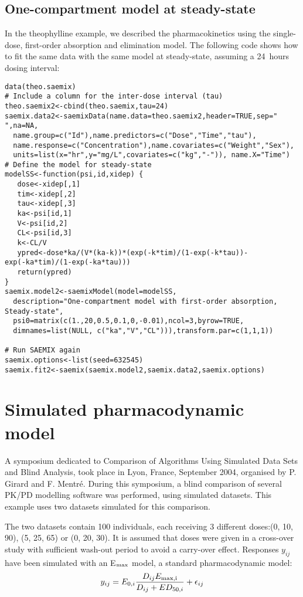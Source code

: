{%

\subsection{One-compartment model at steady-state}

In the theophylline example, we described the pharmacokinetics using the single-dose, first-order absorption and elimination model. The following code shows how to fit the same data with the same model at steady-state, assuming a 24~hours dosing interval:
\begin{verbatim}
data(theo.saemix)
# Include a column for the inter-dose interval (tau)
theo.saemix2<-cbind(theo.saemix,tau=24)
saemix.data2<-saemixData(name.data=theo.saemix2,header=TRUE,sep=" ",na=NA, 
  name.group=c("Id"),name.predictors=c("Dose","Time","tau"),
  name.response=c("Concentration"),name.covariates=c("Weight","Sex"),
  units=list(x="hr",y="mg/L",covariates=c("kg","-")), name.X="Time")
# Define the model for steady-state
modelSS<-function(psi,id,xidep) { 
   dose<-xidep[,1]
   tim<-xidep[,2]  
   tau<-xidep[,3]  
   ka<-psi[id,1]
   V<-psi[id,2]
   CL<-psi[id,3]
   k<-CL/V
   ypred<-dose*ka/(V*(ka-k))*(exp(-k*tim)/(1-exp(-k*tau))-
exp(-ka*tim)/(1-exp(-ka*tau)))
   return(ypred)
}
saemix.model2<-saemixModel(model=modelSS,
  description="One-compartment model with first-order absorption, Steady-state",
  psi0=matrix(c(1.,20,0.5,0.1,0,-0.01),ncol=3,byrow=TRUE, 
  dimnames=list(NULL, c("ka","V","CL"))),transform.par=c(1,1,1))
     
# Run SAEMIX again
saemix.options<-list(seed=632545)
saemix.fit2<-saemix(saemix.model2,saemix.data2,saemix.options)
\end{verbatim}

\section{Simulated pharmacodynamic model}\label{sec:examplePD}

A symposium dedicated to Comparison of Algorithms Using Simulated Data Sets and Blind Analysis, took place in Lyon, France, September 2004, organised by P. Girard and F. Mentr\'e. During this symposium, a blind comparison of several PK/PD modelling software was performed, using simulated datasets. This example uses two datasets simulated for this comparison.

The two datasets contain 100 individuals, each receiving 3 different doses:(0, 10, 90), (5, 25, 65) or (0, 20, 30). It is assumed that doses were given in a cross-over study with sufficient wash-out period to avoid a carry-over effect. Responses $y_{ij}$ have been simulated with an E$_{\rm max}$ model, a standard pharmacodynamic model:
\begin{equation}
y_{ij} = E_{0,i} \frac{\displaystyle D_{ij} E_{\rm max,i}}{D_{ij} + ED_{50,i}} + \epsilon_{ij}
\end{equation}

}
